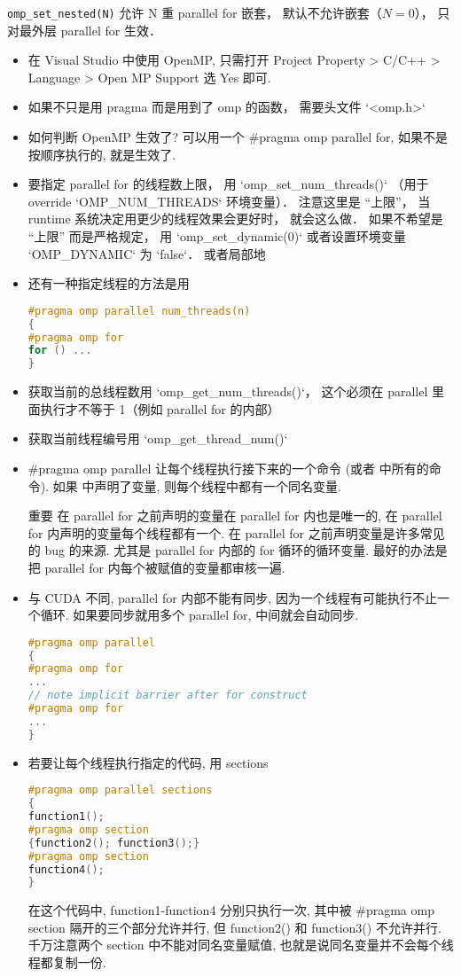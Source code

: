 
\begin{issues}
\issueDraft
\end{issues}


\verb|omp_set_nested(N)| 允许 N 重 parallel for 嵌套， 默认不允许嵌套（$N=0$）， 只对最外层 parallel for 生效．

\begin{itemize}
\item 在 Visual Studio 中使用 OpenMP, 只需打开 Project Property > C/C++ > Language > Open MP Support 选 Yes 即可.
\item 如果不只是用 pragma 而是用到了 omp 的函数， 需要头文件 `<omp.h>`
\item 如何判断 OpenMP 生效了? 可以用一个 #pragma omp parallel for, 如果不是按顺序执行的, 就是生效了.

\item 要指定 parallel for 的线程数上限， 用 `omp_set_num_threads()` （用于 override `OMP_NUM_THREADS` 环境变量）． 注意这里是 “上限”， 当 runtime 系统决定用更少的线程效果会更好时， 就会这么做． 如果不希望是 “上限” 而是严格规定， 用 `omp_set_dynamic(0)` 或者设置环境变量 `OMP_DYNAMIC` 为 `false`．
 或者局部地
\item 还有一种指定线程的方法是用
\begin{lstlisting}[language=cpp]
#pragma omp parallel num_threads(n)
{
#pragma omp for
for () ...
}
\end{lstlisting}
\item 获取当前的总线程数用 `omp_get_num_threads()`， 这个必须在 parallel 里面执行才不等于 1（例如 parallel for 的内部）
\item 获取当前线程编号用 `omp_get_thread_num()`

\item #pragma omp parallel 让每个线程执行接下来的一个命令 (或者 {} 中所有的命令). 如果 {} 中声明了变量, 则每个线程中都有一个同名变量.
\item [重要] 在 parallel for 之前声明的变量在 parallel for 内也是唯一的, 在 parallel for 内声明的变量每个线程都有一个. 在 parallel for 之前声明变量是许多常见的 bug 的来源. 尤其是 parallel for 内部的 for 循环的循环变量. 最好的办法是把 parallel for 内每个被赋值的变量都审核一遍.
\item 与 CUDA 不同, parallel for 内部不能有同步, 因为一个线程有可能执行不止一个循环. 如果要同步就用多个 parallel for, 中间就会自动同步.
\begin{lstlisting}[language=cpp]
#pragma omp parallel
{
#pragma omp for
...
// note implicit barrier after for construct
#pragma omp for
...
}
\end{lstlisting}
\item 若要让每个线程执行指定的代码, 用 sections
\begin{lstlisting}[language=cpp]
#pragma omp parallel sections
{
function1();
#pragma omp section
{function2(); function3();}
#pragma omp section
function4();
}
\end{lstlisting}
在这个代码中, function1-function4 分别只执行一次, 其中被 #pragma omp section 隔开的三个部分允许并行, 但 function2() 和 function3() 不允许并行. 千万注意两个 section 中不能对同名变量赋值, 也就是说同名变量并不会每个线程都复制一份.


\end{itemize}
